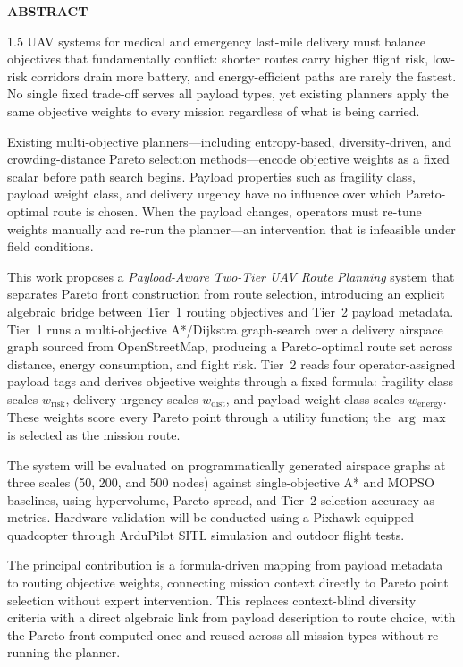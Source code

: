 \documentclass[a4paper, 14pt, oneside]{Thesis}
\begin{document}
\begin{center}
  {\large \bf ABSTRACT \par}
  \bigskip
\end{center}
\begin{spacing}{1.5}
UAV systems for medical and emergency last-mile delivery must balance
objectives that fundamentally conflict: shorter routes carry higher flight
risk, low-risk corridors drain more battery, and energy-efficient paths are
rarely the fastest. No single fixed trade-off serves all payload types, yet
existing planners apply the same objective weights to every mission regardless
of what is being carried.

Existing multi-objective planners---including entropy-based, diversity-driven,
and crowding-distance Pareto selection methods---encode objective weights as a
fixed scalar before path search begins. Payload properties such as fragility
class, payload weight class, and delivery urgency have no influence over
which Pareto-optimal route is chosen. When the payload changes, operators must
re-tune weights manually and re-run the planner---an intervention that is
infeasible under field conditions.

This work proposes a \textit{Payload-Aware Two-Tier UAV Route Planning} system
that separates Pareto front construction from route selection, introducing an
explicit algebraic bridge between Tier~1 routing objectives and Tier~2 payload
metadata. Tier~1 runs a multi-objective A*/Dijkstra graph-search over a
delivery airspace graph sourced from OpenStreetMap, producing a Pareto-optimal
route set across distance, energy consumption, and flight risk. Tier~2 reads
four operator-assigned payload tags and derives objective weights through a
fixed formula: fragility class scales $w_{\mathrm{risk}}$, delivery urgency
scales $w_{\mathrm{dist}}$, and payload weight class scales
$w_{\mathrm{energy}}$. These weights score every Pareto point through a utility
function; the $\arg\max$ is selected as the mission route.

The system will be evaluated on programmatically generated airspace graphs at
three scales (50, 200, and 500 nodes) against single-objective A* and MOPSO
baselines, using hypervolume, Pareto spread, and Tier~2 selection accuracy as
metrics. Hardware validation will be conducted using a Pixhawk-equipped
quadcopter through ArduPilot SITL simulation and outdoor flight tests.

The principal contribution is a formula-driven mapping from payload metadata
to routing objective weights, connecting mission context directly to Pareto
point selection without expert intervention. This replaces context-blind
diversity criteria with a direct algebraic link from payload description to
route choice, with the Pareto front computed once and reused across all mission
types without re-running the planner.
\end{spacing}
\clearpage
\end{document}
